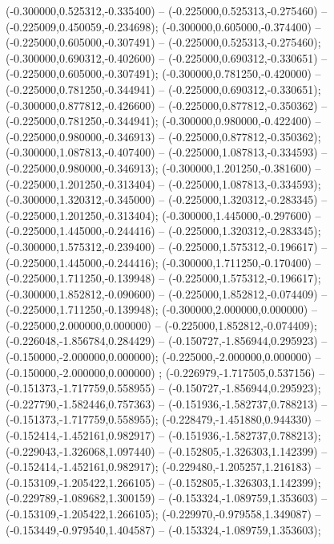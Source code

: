  (-0.300000,0.525312,-0.335400) -- (-0.225000,0.525313,-0.275460) -- (-0.225009,0.450059,-0.234698);
 (-0.300000,0.605000,-0.374400) -- (-0.225000,0.605000,-0.307491) -- (-0.225000,0.525313,-0.275460);
 (-0.300000,0.690312,-0.402600) -- (-0.225000,0.690312,-0.330651) -- (-0.225000,0.605000,-0.307491);
 (-0.300000,0.781250,-0.420000) -- (-0.225000,0.781250,-0.344941) -- (-0.225000,0.690312,-0.330651);
 (-0.300000,0.877812,-0.426600) -- (-0.225000,0.877812,-0.350362) -- (-0.225000,0.781250,-0.344941);
 (-0.300000,0.980000,-0.422400) -- (-0.225000,0.980000,-0.346913) -- (-0.225000,0.877812,-0.350362);
 (-0.300000,1.087813,-0.407400) -- (-0.225000,1.087813,-0.334593) -- (-0.225000,0.980000,-0.346913);
 (-0.300000,1.201250,-0.381600) -- (-0.225000,1.201250,-0.313404) -- (-0.225000,1.087813,-0.334593);
 (-0.300000,1.320312,-0.345000) -- (-0.225000,1.320312,-0.283345) -- (-0.225000,1.201250,-0.313404);
 (-0.300000,1.445000,-0.297600) -- (-0.225000,1.445000,-0.244416) -- (-0.225000,1.320312,-0.283345);
 (-0.300000,1.575312,-0.239400) -- (-0.225000,1.575312,-0.196617) -- (-0.225000,1.445000,-0.244416);
 (-0.300000,1.711250,-0.170400) -- (-0.225000,1.711250,-0.139948) -- (-0.225000,1.575312,-0.196617);
 (-0.300000,1.852812,-0.090600) -- (-0.225000,1.852812,-0.074409) -- (-0.225000,1.711250,-0.139948);
 (-0.300000,2.000000,0.000000) -- (-0.225000,2.000000,0.000000) -- (-0.225000,1.852812,-0.074409);
 (-0.226048,-1.856784,0.284429) -- (-0.150727,-1.856944,0.295923) -- (-0.150000,-2.000000,0.000000);
 (-0.225000,-2.000000,0.000000) -- (-0.150000,-2.000000,0.000000) ;
 (-0.226979,-1.717505,0.537156) -- (-0.151373,-1.717759,0.558955) -- (-0.150727,-1.856944,0.295923);
 (-0.227790,-1.582446,0.757363) -- (-0.151936,-1.582737,0.788213) -- (-0.151373,-1.717759,0.558955);
 (-0.228479,-1.451880,0.944330) -- (-0.152414,-1.452161,0.982917) -- (-0.151936,-1.582737,0.788213);
 (-0.229043,-1.326068,1.097440) -- (-0.152805,-1.326303,1.142399) -- (-0.152414,-1.452161,0.982917);
 (-0.229480,-1.205257,1.216183) -- (-0.153109,-1.205422,1.266105) -- (-0.152805,-1.326303,1.142399);
 (-0.229789,-1.089682,1.300159) -- (-0.153324,-1.089759,1.353603) -- (-0.153109,-1.205422,1.266105);
 (-0.229970,-0.979558,1.349087) -- (-0.153449,-0.979540,1.404587) -- (-0.153324,-1.089759,1.353603);
